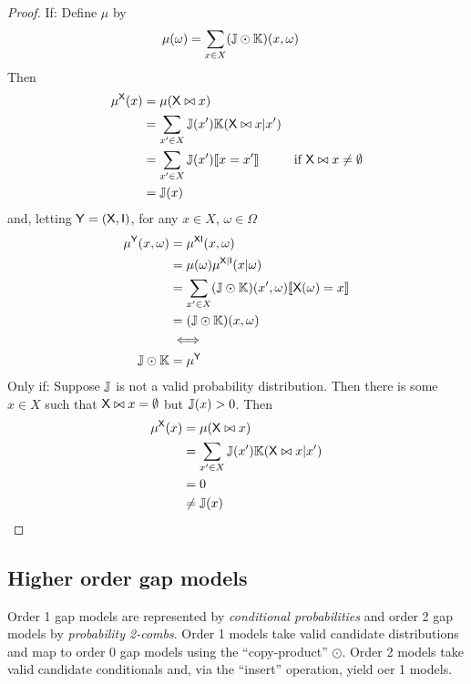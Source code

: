 \begin{proof}
If:
Define $\mu$ by
\begin{align}
	\mu(\omega) &= \sum_{x\in X} (\mathbb{J}\odot \mathbb{K})(x,\omega)
\end{align}
Then
\begin{align}
	\mu^{\mathsf{X}}(x) &= \mu (\mathsf{X}\bowtie x)\\
	&= \sum_{x'\in X} \mathbb{J}(x') \mathbb{K}(\mathsf{X}\bowtie x|x')\\
	&= \sum_{x'\in X} \mathbb{J}(x') \llbracket x=x'\rrbracket&\text{if }\mathsf{X}\bowtie x \neq \emptyset\\
	&= \mathbb{J}(x)
\end{align}
and, letting $\mathsf{Y}=(\mathsf{X},\mathsf{I})$, for any $x\in X$, $\omega\in \Omega$
\begin{align}
	\mu^{\mathsf{Y}}(x,\omega) &= \mu^{\mathsf{XI}}(x,\omega)\\
	&= \mu(\omega)\mu^{\mathsf{X}|\mathsf{I}}(x|\omega)\\
	&= \sum_{x'\in X} (\mathbb{J}\odot \mathbb{K})(x',\omega) \llbracket \mathsf{X}(\omega) = x \rrbracket\\
	&= (\mathbb{J}\odot \mathbb{K})(x,\omega)\\
	&\iff\\
	\mathbb{J}\odot \mathbb{K}&=\mu^{\mathsf{Y}}
\end{align}
Only if:
Suppose $\mathbb{J}$ is not a valid probability distribution. Then there is some $x\in X$ such that $\mathsf{X}\bowtie x = \emptyset$ but $\mathbb{J}(x)>0$. Then
\begin{align}
	\mu^{\mathsf{X}}(x) &= \mu (\mathsf{X}\bowtie x)\\
	&= \sum_{x'\in X} \mathbb{J}(x') \mathbb{K}(\mathsf{X}\bowtie x|x')\\
	&= 0\\
	&\neq \mathbb{J}(x)
\end{align}
\end{proof}

\subsection{Higher order gap models}\label{sec:validity_of_gapprob}

Order 1 gap models are represented by \emph{conditional probabilities} and order 2 gap models by \emph{probability 2-combs}. Order 1 models take valid candidate distributions and map to order 0 gap models using the ``copy-product'' $\odot$. Order 2 models take valid candidate conditionals and, via the ``insert'' operation, yield oer 1 models.

